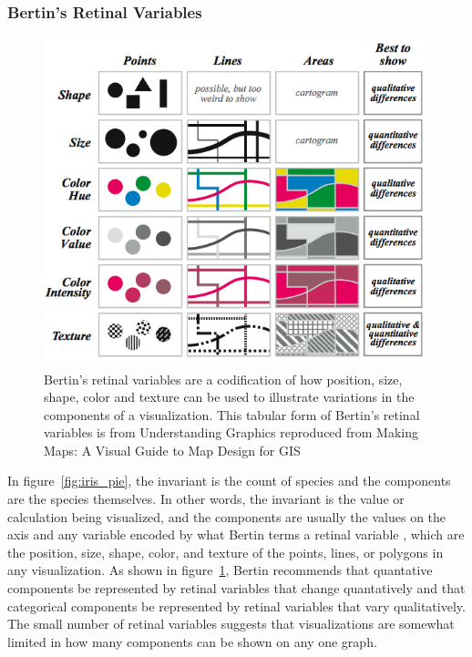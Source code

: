 \documentclass[letterpaper,onecolumn,titlepage]{Ythesis}
\begin{document}
\subsubsection{Bertin's Retinal Variables}
\begin{figure}
\includegraphics[width=1\textwidth]{intro/retinal_variables.png}
\caption{Bertin's retinal variables are a codification of how position, size, shape, color and texture can be used to illustrate variations in the components of a visualization. This tabular form of Bertin's retinal variables is from Understanding Graphics \cite{_information_????} reproduced from Making Maps: A Visual Guide to Map Design for GIS \cite{krygier_making_2005}}
\label{fig:retinal_variables}
\end{figure}

In figure~\ref{fig:iris_pie}, the invariant is the count of species and the components are the species themselves. In other words, the invariant is the value or calculation being visualized, and the components are usually the values on the axis and any variable encoded by what Bertin terms a retinal variable \cite{bertin_semiology_2011,krygier_making_2005}, which are the position, size, shape, color, and texture of the points, lines, or polygons in any visualization. As shown in figure~\ref{fig:retinal_variables}, Bertin recommends that quantative components be represented by retinal variables that change quantatively and that categorical components be represented by retinal variables that vary qualitatively. The small number of retinal variables suggests that visualizations are somewhat limited in how many components can be shown on any one graph.
\end{document}
